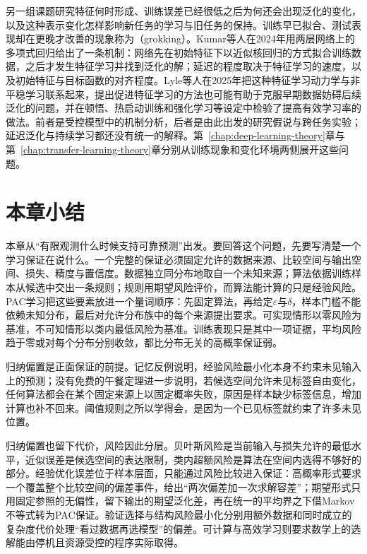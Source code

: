 另一组课题研究特征何时形成、训练误差已经很低之后为何还会出现泛化的变化，以及这种表示变化怎样影响新任务的学习与旧任务的保持。训练早已拟合、测试表现却在更晚才改善的现象称为（grokking）。Kumar等人在2024年用两层网络上的多项式回归给出了一条机制：网络先在初始特征下以近似核回归的方式拟合训练数据，之后才发生特征学习并找到泛化的解；延迟的程度取决于特征学习的速度，以及初始特征与目标函数的对齐程度。Lyle等人在2025年把这种特征学习动力学与非平稳学习联系起来，提出促进特征学习的方法也可能有助于克服早期数据妨碍后续泛化的问题，并在顿悟、热启动训练和强化学习等设定中检验了提高有效学习率的做法。前者是受控模型中的机制分析，后者是由此出发的研究假说与跨任务实验；延迟泛化与持续学习都还没有统一的解释。第~\ref{chap:deep-learning-theory}章与第~\ref{chap:transfer-learning-theory}章分别从训练现象和变化环境两侧展开这些问题。

\section{本章小结}
\label{sec:statistical-framework-summary}

本章从“有限观测什么时候支持可靠预测”出发。要回答这个问题，先要写清楚一个学习保证在说什么。一个完整的保证必须固定允许的数据来源、比较空间与输出空间、损失、精度与置信度。数据独立同分布地取自一个未知来源；算法依据训练样本从候选中交出一条规则；规则用期望风险评价，而算法能计算的只是经验风险。PAC学习把这些要素放进一个量词顺序：先固定算法，再给定$\varepsilon$与$\delta$，样本门槛不能依赖未知分布，最后对允许分布族中的每个来源提出要求。可实现情形以零风险为基准，不可知情形以类内最低风险为基准。训练表现只是其中一项证据，平均风险趋于零或对每个分布分别收敛，都比分布无关的高概率保证弱。

归纳偏置是正面保证的前提。记忆反例说明，经验风险最小化本身不约束未见输入上的预测；没有免费的午餐定理进一步说明，若候选空间允许未见标签自由变化，任何算法都会在某个固定来源上以固定概率失败，原因是样本缺少标签信息，增加计算也补不回来。阈值规则之所以学得会，是因为一个已见标签就约束了许多未见位置。

归纳偏置也留下代价，风险因此分层。贝叶斯风险是当前输入与损失允许的最低水平，近似误差是候选空间的表达限制，类内超额风险是算法在空间内选得不够好的部分。经验优化误差位于样本层面，只能通过风险比较进入保证：高概率形式要求一个覆盖整个比较空间的偏差事件，给出“两次偏差加一次求解容差”；期望形式只用固定参照的无偏性，留下输出的期望泛化差，再在统一的平均界之下借Markov不等式转为PAC保证。验证选择与结构风险最小化分别用额外数据和同时成立的复杂度代价处理“看过数据再选模型”的偏差。可计算与高效学习则要求数学上的选解能由停机且资源受控的程序实际取得。


